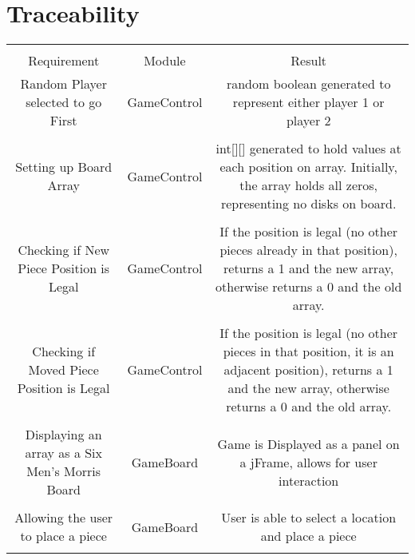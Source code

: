 \documentclass[12pt]{article}
\begin{document}
\begin{itemize}
\begin{itemize}
	\end{itemize}
	
	
	\end{itemize}
	\section{Traceability}
	\begin{tabularx}{\linewidth}{|C|C|C|}
		\hline \\
		Requirement & Module & Result \\
		\hline
		Random Player selected to go First & GameControl & random boolean generated to represent either player 1 or player 2 \\
		\hline \\
		Setting up Board Array & GameControl & int[][] generated to hold values at each position on array. Initially, the array holds all zeros, representing no disks on board. \\
		\hline \\
		Checking if New Piece Position is Legal & GameControl & If the position is legal (no other pieces already in that position), returns a 1 and the new array, otherwise returns a 0 and the old array. \\ 
		\hline \\
		Checking if Moved Piece Position is Legal & GameControl & If the position is legal (no other pieces in that position, it is an adjacent position), returns a 1 and the new array, otherwise returns a 0 and the old array.\\
		\hline \\
		Displaying an array as a Six Men's Morris Board &
		GameBoard & Game is Displayed as a panel on a jFrame, allows for user interaction \\ 
		\hline \\
		Allowing the user to place a piece & GameBoard &
		User is able to select a location and place a piece \\
		\hline \\
	\end{tabularx}
\end{document}
